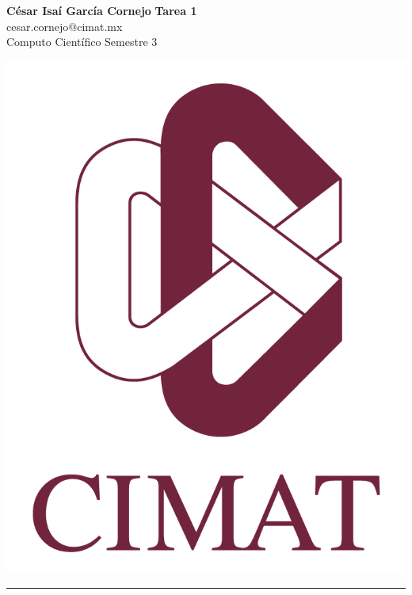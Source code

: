 \documentclass[a4paper, 11pt]{article}
\begin{document}
	\noindent
	
	\begin{minipage}[b][1.2cm][t]{0.8\textwidth}
		\large\textbf{César Isaí García Cornejo} \hfill \textbf{Tarea 1}  \\
		cesar.cornejo@cimat.mx \hfill \\
		\normalsize Computo Científico \hfill Semestre 3\\
	\end{minipage}
	
	\hspace{14.4cm}
	\begin{minipage}[b][0.03cm][t]{0.12\linewidth}
		
		\vspace{-2.2cm}
		\includegraphics[scale=0.3]{Figures/EscudoCimat.png}
	\end{minipage}
	
	\noindent\rule{7in}{2.8pt}
	
\end{document}

